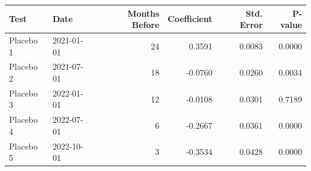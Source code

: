 \begin{tabular}{llrrrr}
\hline
Test & Date & Months Before & Coefficient & Std. Error & P-value \\
\hline
Placebo 1 & 2021-01-01 & 24 & 0.3591 & 0.0083 & 0.0000 \\
Placebo 2 & 2021-07-01 & 18 & -0.0760 & 0.0260 & 0.0034 \\
Placebo 3 & 2022-01-01 & 12 & -0.0108 & 0.0301 & 0.7189 \\
Placebo 4 & 2022-07-01 & 6 & -0.2667 & 0.0361 & 0.0000 \\
Placebo 5 & 2022-10-01 & 3 & -0.3534 & 0.0428 & 0.0000 \\
\hline
\end{tabular}
